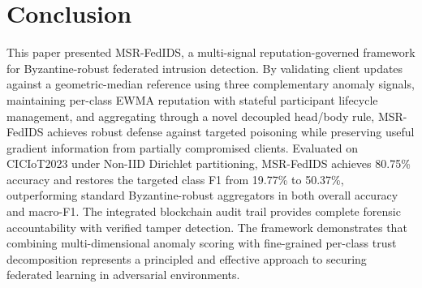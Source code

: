 \documentclass[conference]{IEEEtran}
\begin{document}
\section{Conclusion}
\label{sec:conclusion}
This paper presented MSR-FedIDS, a multi-signal reputation-governed framework for Byzantine-robust federated intrusion detection. By validating client updates against a geometric-median reference using three complementary anomaly signals, maintaining per-class EWMA reputation with stateful participant lifecycle management, and aggregating through a novel decoupled head/body rule, MSR-FedIDS achieves robust defense against targeted poisoning while preserving useful gradient information from partially compromised clients. Evaluated on CICIoT2023 under Non-IID Dirichlet partitioning, MSR-FedIDS achieves 80.75\% accuracy and restores the targeted class F1 from 19.77\% to 50.37\%, outperforming standard Byzantine-robust aggregators in both overall accuracy and macro-F1. The integrated blockchain audit trail provides complete forensic accountability with verified tamper detection. The framework demonstrates that combining multi-dimensional anomaly scoring with fine-grained per-class trust decomposition represents a principled and effective approach to securing federated learning in adversarial environments.
\end{document}
